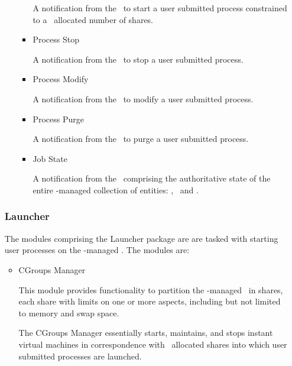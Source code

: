 \begin{itemize}
\begin{itemize}
\begin{itemize}
      A notification from the \varProcessManager~to start a user submitted 
      process constrained to a \varResourceManager~allocated number of shares.
      
      \item Process Stop
      
      A notification from the \varProcessManager~to stop a user submitted 
      process.
      
      \item Process Modify
            
      A notification from the \varProcessManager~to modify a user submitted 
      process.
      
      \item Process Purge
                  
      A notification from the \varProcessManager~to purge a user submitted 
      process.
      
      \item Job State
                        
      A notification from the \varOrchestrator~comprising the authoritative
      state of the entire \varDUCC-managed collection of entities: 
      \varJobs, \varReservations~and \varServices.
      
      \end{itemize}  

    \end{itemize}     
                 
    \subsubsection{Launcher}   
          
    The modules comprising the Launcher package are are tasked with
    starting user processes on the \varAgent-managed \varNodeMachineComputer.
    The modules are:
            
    \begin{itemize}
      \item CGroups Manager
      
      This module provides functionality to partition the \varAgent-managed
      \varNodeMachineComputer~in shares, each share with limits on one
      or more aspects, including but not limited to memory and swap space. 
      
      The CGroups Manager essentially starts, maintains, and stops instant
      virtual machines in correspondence with \varResourceManager~allocated
      shares into which user submitted processes are launched.
      

\end{itemize}
\end{itemize}
